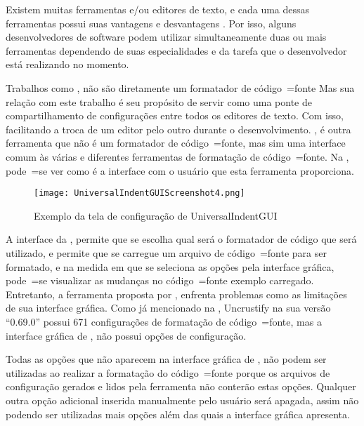 Existem muitas ferramentas e\slash{}ou editores de texto,
e cada uma dessas ferramentas possui suas vantagens e
desvantagens \cite{prettyPrintingOfVisualSentences,anAbstractPrettyPrinter,improvingRefactoringSpeed}.
Por isso,
alguns desenvolvedores de software podem utilizar simultaneamente duas ou
mais ferramentas dependendo de suas especialidades e
da tarefa que o desenvolvedor está realizando no momento.

Trabalhos como ,
não são diretamente um formatador de código~=fonte Mas sua relação com este trabalho é seu propósito de servir como uma ponte de compartilhamento de configurações entre todos os editores de texto.
Com isso,
facilitando a troca de um editor pelo outro durante o desenvolvimento.
,
é outra ferramenta que não é um formatador de código~=fonte,
mas sim uma interface comum às várias e
diferentes ferramentas de formatação de código~=fonte.
Na ,
pode~=se ver como é a interface com o usuário que esta ferramenta proporciona.

\begin{figure}[!htb]
\caption{Exemplo da tela de configuração de UniversalIndentGUI}
\label{figure:UniversalIndentGUIScreenshot4}
\centering
\texttt{[image: UniversalIndentGUIScreenshot4.png]}
\end{figure}

A interface da ,
permite que se escolha qual será o formatador de código que será utilizado,
e permite que se carregue um arquivo de código~=fonte para ser formatado,
e na medida em que se seleciona as opções pela interface gráfica,
pode~=se visualizar as mudanças no código~=fonte exemplo carregado.
Entretanto,
a ferramenta proposta por ,
enfrenta problemas como as limitações de sua interface gráfica.
Como já mencionado na ,
Uncrustify na sua versão ``0.69.0'' possui 671 configurações de formatação de código~=fonte,
mas a interface gráfica de ,
não possui  opções de configuração.

Todas as opções que não aparecem na interface gráfica de ,
não podem ser utilizadas ao realizar a formatação do código~=fonte porque os arquivos de configuração gerados e
lidos pela ferramenta não conterão estas opções.
Qualquer outra opção adicional inserida manualmente pelo usuário será apagada,
assim não podendo ser utilizadas mais opções além das quais a interface gráfica apresenta.

